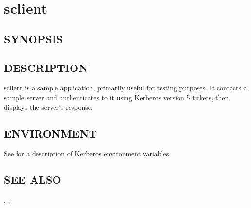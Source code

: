 \documentclass[letterpaper,10pt,english]{sphinxmanual}
\begin{document}
\section{sclient}
\label{\detokenize{user/user_commands/sclient:sclient}}\label{\detokenize{user/user_commands/sclient::doc}}\label{\detokenize{user/user_commands/sclient:sclient-1}}

\subsection{SYNOPSIS}
\label{\detokenize{user/user_commands/sclient:synopsis}}
 


\subsection{DESCRIPTION}
\label{\detokenize{user/user_commands/sclient:description}}
sclient is a sample application, primarily useful for testing
purposes.  It contacts a sample server  and
authenticates to it using Kerberos version 5 tickets, then displays
the server’s response.


\subsection{ENVIRONMENT}
\label{\detokenize{user/user_commands/sclient:environment}}
See {\hyperref[\detokenize{user/user_config/kerberos:kerberos-7}]{}} for a description of Kerberos environment
variables.


\subsection{SEE ALSO}
\label{\detokenize{user/user_commands/sclient:see-also}}
{\hyperref[\detokenize{user/user_commands/kinit:kinit-1}]{}}, , {\hyperref[\detokenize{user/user_config/kerberos:kerberos-7}]{}}



\renewcommand{\indexname}{Index}
\printindex
\end{document}
